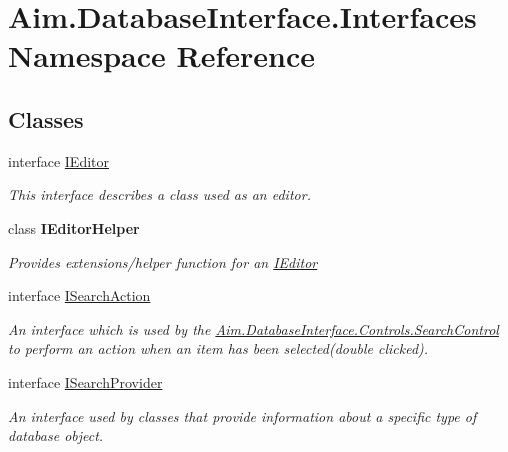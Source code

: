 \hypertarget{namespace_aim_1_1_database_interface_1_1_interfaces}{}\section{Aim.\+Database\+Interface.\+Interfaces Namespace Reference}
\label{namespace_aim_1_1_database_interface_1_1_interfaces}
\subsection*{Classes}
\begin{DoxyCompactItemize}
\item 
interface \mbox{\hyperlink{interface_aim_1_1_database_interface_1_1_interfaces_1_1_i_editor}{I\+Editor}}
\begin{DoxyCompactList}\small\item\em This interface describes a class used as an editor. \end{DoxyCompactList}\item 
class {\bfseries I\+Editor\+Helper}
\begin{DoxyCompactList}\small\item\em Provides extensions/helper function for an \mbox{\hyperlink{interface_aim_1_1_database_interface_1_1_interfaces_1_1_i_editor}{I\+Editor}} \end{DoxyCompactList}\item 
interface \mbox{\hyperlink{interface_aim_1_1_database_interface_1_1_interfaces_1_1_i_search_action}{I\+Search\+Action}}
\begin{DoxyCompactList}\small\item\em An interface which is used by the \mbox{\hyperlink{class_aim_1_1_database_interface_1_1_controls_1_1_search_control}{Aim.\+Database\+Interface.\+Controls.\+Search\+Control}} to perform an action when an item has been selected(double clicked). \end{DoxyCompactList}\item 
interface \mbox{\hyperlink{interface_aim_1_1_database_interface_1_1_interfaces_1_1_i_search_provider}{I\+Search\+Provider}}
\begin{DoxyCompactList}\small\item\em An interface used by classes that provide information about a specific type of database object. \end{DoxyCompactList}\end{DoxyCompactItemize}
